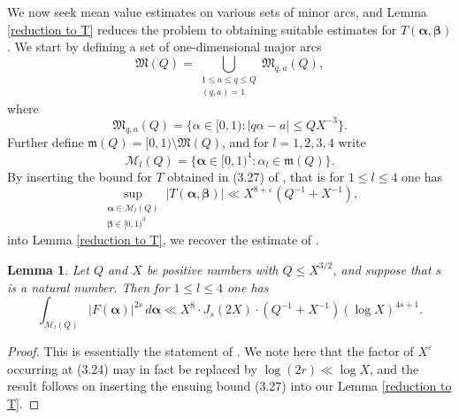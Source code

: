 \documentclass{amsart}%
\numberwithin{equation}{section}
\newtheorem{lemma}[theorem]{Lemma}
\theoremstyle{remark}
\newcommand{\fm}{{\mathfrak m}}
\newcommand{\fM}{{\mathfrak M}}
\newcommand{\cM}{{\mathcal M}}
\newcommand{\1}{\mathbbm{1}}
\begin{document}
We now seek mean value estimates on various sets of minor arcs, and Lemma \ref{reduction to T} reduces the problem to obtaining suitable estimates for $T(\boldsymbol{\alpha}, \boldsymbol{\beta})$. 
We start by defining a set of one-dimensional major arcs
\begin{equation*}
\fM(Q) = \bigcup_{\substack{1 \le a \le q \le Q \\ (q,a)=1}} \fM_{q,a}(Q),    
\end{equation*}
where
\begin{equation*}
\fM_{q,a}(Q) = \{\alpha \in [0,1): |q\alpha - a| \le Q X^{-3}\}.
\end{equation*}
Further define $\fm(Q) = [0,1) \setminus \fM(Q)$, and for $l = 1,2,3,4$ write
\begin{equation*}
\cM_l(Q) = \{\boldsymbol{\alpha} \in [0,1)^{4} : \alpha_l \in \fm(Q)\}.
\end{equation*}
By inserting the bound for $T$ obtained in (3.27) of \cite{ky2026}, that is for $1\leq l\leq 4$ one has
\begin{equation}\label{basic exponential sum}
     \sup_{\substack{\boldsymbol{\alpha}\in \mathcal{M}_l(Q)\\ \boldsymbol{\beta}\in [0,1)^3 }}|T(\boldsymbol{\alpha},\boldsymbol{\beta})|\ll X^{8+\varepsilon}(Q^{-1}+X^{-1}),
\end{equation}
into Lemma \ref{reduction to T}, we recover the estimate of \cite[Lemma 3.1]{ky2026}.

\begin{lemma}\label{basic minor}
    Let $Q$ and $X$ be positive numbers with $Q \le X^{3/2}$, and suppose that $s$ is a natural number. Then for $1 \le l \le 4$ one has
    \begin{equation*}\label{meanvalue lemma 2.2}
        \int_{\cM_l(Q)} |F(\boldsymbol{\alpha})|^{2s}\, d\boldsymbol{\alpha} \ll X^{8} \cdot J_s(2X) \cdot (Q^{-1} + X^{-1})(\log X)^{4s+1}. 
     \end{equation*}
\end{lemma}

\begin{proof}
This is essentially the statement of \cite[Lemma 3.1]{ky2026}. We note here that the factor of $X^{\varepsilon}$ occurring at (3.24) may in fact be replaced by $\log(2r) \ll \log X$, and the result follows on inserting the ensuing bound (3.27) into our Lemma \ref{reduction to T}.
\end{proof}
\end{document}
